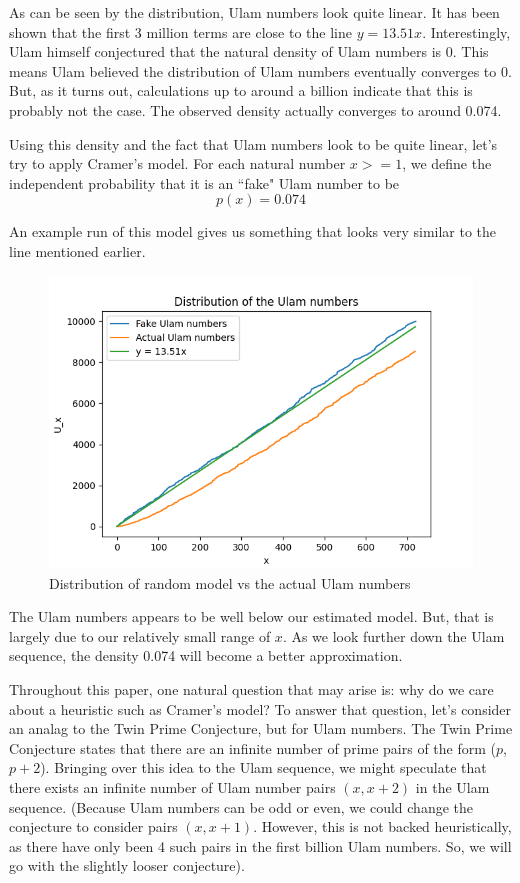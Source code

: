 \documentclass[conference]{IEEEtran}
\begin{document}

As can be seen by the distribution, Ulam numbers look quite linear. It has been shown that the first 3 million terms are close to the line $y = 13.51x$. Interestingly, Ulam himself conjectured that the natural density of Ulam numbers is 0. This means Ulam believed the distribution of Ulam numbers eventually converges to 0. But, as it turns out, calculations up to around a billion indicate that this is probably not the case. The observed density actually converges to around 0.074. 

Using this density and the fact that Ulam numbers look to be quite linear, let's try to apply Cramer's model. For each natural number $x >= 1$, we define the independent probability that it is an ``fake" Ulam number to be \[p(x) = 0.074\]

An example run of this model gives us something that looks very similar to the line mentioned earlier.

\begin{figure}[H]
  \centering
  \includegraphics[width=\linewidth,keepaspectratio]{../images/fake_ulam.png}
  \caption{Distribution of random model vs the actual Ulam numbers}
\end{figure}

The Ulam numbers appears to be well below our estimated model. But, that is largely due to our relatively small range of $x$. As we look further down the Ulam sequence, the density 0.074 will become a better approximation.

Throughout this paper, one natural question that may arise is: why do we care about a heuristic such as Cramer's model? To answer that question, let's consider an analag to the Twin Prime Conjecture, but for Ulam numbers. The Twin Prime Conjecture states that there are an infinite number of prime pairs of the form ($p$, $p + 2$). Bringing over this idea to the Ulam sequence, we might speculate that there exists an infinite number of Ulam number pairs $(x, x + 2)$ in the Ulam sequence. (Because Ulam numbers can be odd or even, we could change the conjecture to consider pairs $(x, x + 1)$. However, this is not backed heuristically, as there have only been 4 such pairs in the first billion Ulam numbers. So, we will go with the slightly looser conjecture). 
\end{document}
